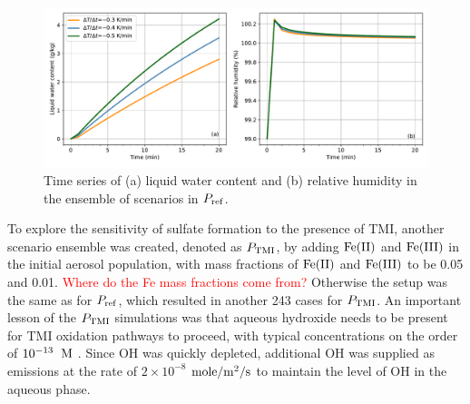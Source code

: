 \documentclass[edeposit,fullpage]{uiucthesis2009}
\makeatletter
\DeclareRobustCommand*\unit[1]
 {\ensuremath{%
   {\thinmuskip3mu\relax
    \def\mu{\text{\textmu}}\def~{\,}%
    \ifx\f@series\testbx\mathbf{#1}\else\mathrm{#1}\fi}}}
\makeatother
\begin{document}
\begin{figure}[ht]
    \centering \includegraphics[scale=0.55]{chap2_figs/chap2_mono_lwc_rh.pdf}
    \caption{Time series of (a) liquid water content and (b) relative
      humidity in the ensemble of scenarios in $P_{\rm ref}$.}
    \label{chap2:ensemrh}
\end{figure}

To explore the sensitivity of sulfate formation to the presence of
TMI, another scenario ensemble was created, denoted as $P_{\rm TMI}$,
by adding $\rm Fe(II)$ and $\rm Fe(III)$ in the initial aerosol
population, with mass fractions of $\rm Fe(II)$ and $\rm Fe(III)$ to
be 0.05 and 0.01. \textcolor{red}{Where do the Fe mass fractions come
  from?} Otherwise the setup was the same as for $P_{\rm ref}$, which
resulted in another 243 cases for $P_{\rm TMI}$. An important lesson
of the $P_{\rm TMI}$ simulations was that aqueous hydroxide needs to
be present for TMI oxidation pathways to proceed, with typical
concentrations on the order of $\rm 10^{-13}$~\unit{M}
\citet{deguillaume2004role}. Since OH was quickly depleted, additional
OH was supplied as emissions at the rate of $2\times 10^{-8}$
\unit{mole/m^2/s} to maintain the level of OH in the aqueous phase.
\end{document}
